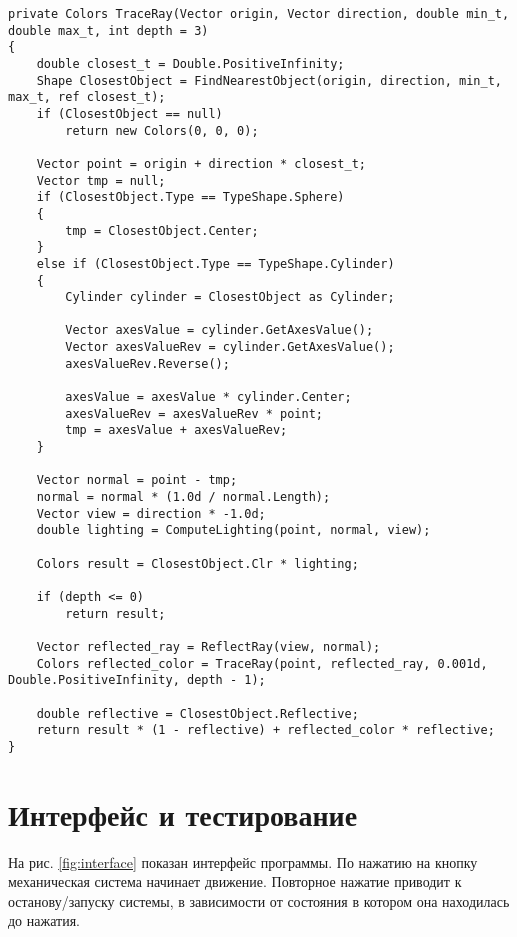 \newpage
\begin{lstlisting}[label=some-code,caption=Трассировка лучей.]
private Colors TraceRay(Vector origin, Vector direction, double min_t, double max_t, int depth = 3)
{
	double closest_t = Double.PositiveInfinity;
	Shape ClosestObject = FindNearestObject(origin, direction, min_t, max_t, ref closest_t);
	if (ClosestObject == null)
		return new Colors(0, 0, 0);

	Vector point = origin + direction * closest_t;
	Vector tmp = null;
	if (ClosestObject.Type == TypeShape.Sphere)
	{
		tmp = ClosestObject.Center;
	}
	else if (ClosestObject.Type == TypeShape.Cylinder)
	{
		Cylinder cylinder = ClosestObject as Cylinder;

		Vector axesValue = cylinder.GetAxesValue();   
		Vector axesValueRev = cylinder.GetAxesValue(); 		
		axesValueRev.Reverse();

		axesValue = axesValue * cylinder.Center; 
		axesValueRev = axesValueRev * point;
		tmp = axesValue + axesValueRev; 
	}

	Vector normal = point - tmp;
	normal = normal * (1.0d / normal.Length);
	Vector view = direction * -1.0d;
	double lighting = ComputeLighting(point, normal, view);

	Colors result = ClosestObject.Clr * lighting;

	if (depth <= 0)
		return result;

	Vector reflected_ray = ReflectRay(view, normal);
	Colors reflected_color = TraceRay(point, reflected_ray, 0.001d, Double.PositiveInfinity, depth - 1);

	double reflective = ClosestObject.Reflective;
	return result * (1 - reflective) + reflected_color * reflective;
}
\end{lstlisting}

\section{Интерфейс и тестирование}

На рис. \ref{fig:interface} показан интерфейс программы.
По нажатию на кнопку механическая система начинает движение.
Повторное нажатие приводит к останову/запуску системы, в зависимости от
состояния в котором она находилась до нажатия.

\begin{figure}[ht!]
\end{figure}

